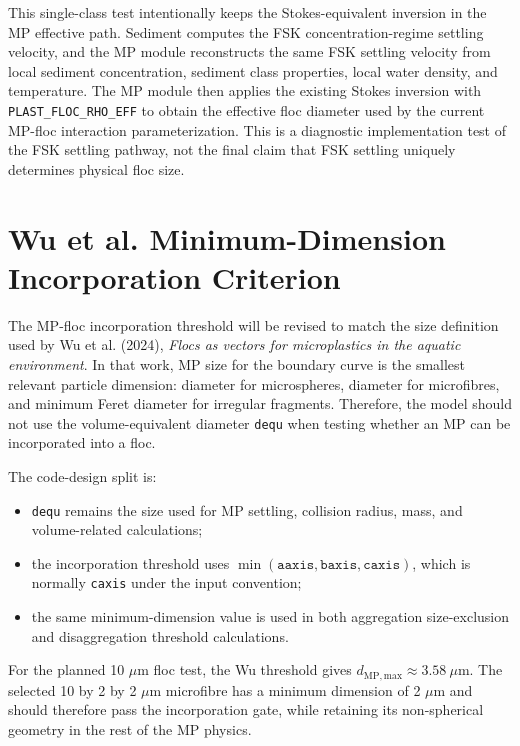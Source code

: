 \documentclass[11pt]{article}
\begin{document}
This single-class test intentionally keeps the Stokes-equivalent inversion in
the MP effective path.  Sediment computes the FSK concentration-regime settling
velocity, and the MP module reconstructs the same FSK settling velocity from
local sediment concentration, sediment class properties, local water density,
and temperature.  The MP module then applies the existing Stokes inversion with
\texttt{PLAST\_FLOC\_RHO\_EFF} to obtain the effective floc diameter used by the
current MP-floc interaction parameterization.  This is a diagnostic
implementation test of the FSK settling pathway, not the final claim that FSK
settling uniquely determines physical floc size.

\section*{Wu et al. Minimum-Dimension Incorporation Criterion}

The MP-floc incorporation threshold will be revised to match the size
definition used by Wu et al. (2024), \emph{Flocs as vectors for microplastics
in the aquatic environment}.  In that work, MP size for the boundary curve is
the smallest relevant particle dimension: diameter for microspheres, diameter
for microfibres, and minimum Feret diameter for irregular fragments.  Therefore,
the model should not use the volume-equivalent diameter \texttt{dequ} when
testing whether an MP can be incorporated into a floc.

The code-design split is:
\begin{itemize}
  \item \texttt{dequ} remains the size used for MP settling, collision radius,
        mass, and volume-related calculations;
  \item the incorporation threshold uses
        $\min(\texttt{aaxis},\texttt{baxis},\texttt{caxis})$, which is normally
        \texttt{caxis} under the input convention;
  \item the same minimum-dimension value is used in both aggregation
        size-exclusion and disaggregation threshold calculations.
\end{itemize}

For the planned 10 $\mu$m floc test, the Wu threshold gives
$d_{\mathrm{MP,max}}\approx3.58~\mu$m.  The selected 10 by 2 by 2 $\mu$m
microfibre has a minimum dimension of 2 $\mu$m and should therefore pass the
incorporation gate, while retaining its non-spherical geometry in the rest of
the MP physics.
\end{document}
